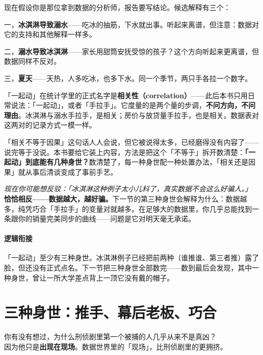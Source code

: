 \documentclass[../../main2.tex]{subfiles}
\begin{document}
	现在假设你是那位拿到数据的分析师，报告要写结论。候选解释有三个：

	一，\textbf{冰淇淋导致溺水}——吃冰的抽筋，下水就出事。听起来离谱，但注意：数据对它的支持和其他解释一样多。

	二，\textbf{溺水导致冰淇淋}——家长用甜筒安抚受惊的孩子？这个方向听起来更离谱，但数据同样不反对。

	三，\textbf{夏天}——天热，人多吃冰，也多下水。同一个季节，两只手各拉一个数字。

	「一起动」在统计学里的正式名字是\textbf{相关性（correlation）}——此后本书只用日常说法：「一起动」，或者「手拉手」。它度量的是两个量的步调，\textbf{不问方向，不问理由}。冰淇淋与溺水手拉手，是相关；房价与放贷量手拉手，也是相关。数据表对这两对的记录方式一模一样。

	「相关不等于因果」这句话人人会说，但它被说得太多，已经磨得没有内容了——说完等于没说。本书要给它装上内容，方法是把这个「不等于」拆开数清楚：\textbf{「一起动」到底能有几种身世？}数清楚了，每一种身世配一种处置办法，「相关还是因果」就从事后清谈变成了事前手艺。

	\begin{questionbox}
		\textit{现在你可能想反驳：「冰淇淋这种例子太小儿科了，真实数据不会这么好骗人。」}\\
		\textbf{恰恰相反——数据越大，越好骗。}下一节的第三种身世会解释为什么：数据越多，纯凭巧合「手拉手」的变量对就越多。在足够大的数据里，你几乎总能找到一条跟你的销量完美同步的曲线——问题是它对明天毫无承诺。
	\end{questionbox}

	\paragraph*{逻辑衔接}
	「一起动」至少有三种身世。冰淇淋例子已经把前两种（谁推谁、第三者推）露了脸，但还没有正式点名。下一节把三种身世全部数完——数到最后会发现，其中一种身世，曾让一所大学差点背上一顶它没有戴的帽子。

	\section{三种身世：推手、幕后老板、巧合}
	\label{sec:pred-origins}

	\begin{readingnote}
		你有没有想过，为什么刑侦剧里第一个被捕的人几乎从来不是真凶？\\
		因为他只是\textbf{出现在现场}。数据世界里的「现场」，比刑侦剧里的更拥挤。
	\end{readingnote}
\end{document}
